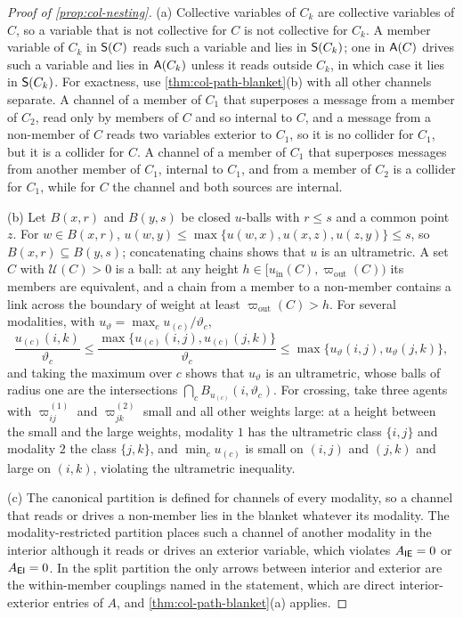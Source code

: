 \begin{proof}[Proof of \cref{prop:col-nesting}]
(a) Collective variables of $C_k$ are collective variables of $C$, so a variable that is not collective for $C$ is not collective for $C_k$. A member variable of $C_k$ in $\mathsf{S}(C)$ reads such a variable and lies in $\mathsf{S}(C_k)$; one in $\mathsf{A}(C)$ drives such a variable and lies in $\mathsf{A}(C_k)$ unless it reads outside $C_k$, in which case it lies in $\mathsf{S}(C_k)$. For exactness, use \cref{thm:col-path-blanket}(b) with all other channels separate. A channel of a member of $C_1$ that superposes a message from a member of $C_2$, read only by members of $C$ and so internal to $C$, and a message from a non-member of $C$ reads two variables exterior to $C_1$, so it is no collider for $C_1$, but it is a collider for $C$. A channel of a member of $C_1$ that superposes messages from another member of $C_1$, internal to $C_1$, and from a member of $C_2$ is a collider for $C_1$, while for $C$ the channel and both sources are internal.

(b) Let $B(x,r)$ and $B(y,s)$ be closed $u$-balls with $r\le s$ and a common point $z$. For $w\in B(x,r)$, $u(w,y)\le\max\{u(w,x),u(x,z),u(z,y)\}\le s$, so $B(x,r)\subseteq B(y,s)$; concatenating chains shows that $u$ is an ultrametric. A set $C$ with $\mathcal U(C)>0$ is a ball: at any height $h\in[u_{\mathrm{in}}(C),\varpi_{\mathrm{out}}(C))$ its members are equivalent, and a chain from a member to a non-member contains a link across the boundary of weight at least $\varpi_{\mathrm{out}}(C)>h$. For several modalities, with $u_\vartheta=\max_cu_{(c)}/\vartheta_c$,
\[
\frac{u_{(c)}(i,k)}{\vartheta_c}\le\frac{\max\{u_{(c)}(i,j),u_{(c)}(j,k)\}}{\vartheta_c}\le\max\{u_\vartheta(i,j),u_\vartheta(j,k)\},
\]
and taking the maximum over $c$ shows that $u_\vartheta$ is an ultrametric, whose balls of radius one are the intersections $\bigcap_cB_{u_{(c)}}(i,\vartheta_c)$. For crossing, take three agents with $\varpi^{(1)}_{ij}$ and $\varpi^{(2)}_{jk}$ small and all other weights large: at a height between the small and the large weights, modality $1$ has the ultrametric class $\{i,j\}$ and modality $2$ the class $\{j,k\}$, and $\min_cu_{(c)}$ is small on $(i,j)$ and $(j,k)$ and large on $(i,k)$, violating the ultrametric inequality.

(c) The canonical partition is defined for channels of every modality, so a channel that reads or drives a non-member lies in the blanket whatever its modality. The modality-restricted partition places such a channel of another modality in the interior although it reads or drives an exterior variable, which violates $A_{\mathsf{I}\mathsf{E}}=0$ or $A_{\mathsf{E}\mathsf{I}}=0$. In the split partition the only arrows between interior and exterior are the within-member couplings named in the statement, which are direct interior-exterior entries of $A$, and \cref{thm:col-path-blanket}(a) applies.
\end{proof}

